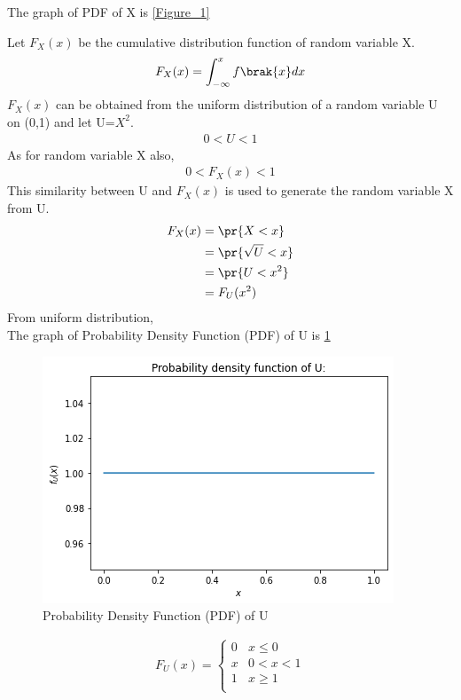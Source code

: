 The graph of PDF of X is \ref{Figure_1}
\par Let $F_X(x)$ be the cumulative distribution function of random variable X.
\begin{align}
    F_X(x)=\int_{-\infty}^x f\brak{x} dx\label{x}
\end{align}
$F_X(x)$ can be obtained from the uniform distribution of a random variable U on (0,1) and let U=$X^2$. 
\begin{align}
    0 < U < 1
\end{align}
As for random variable X also,
\begin{align}
    0 < F_X(x) < 1
\end{align}
This similarity between U and $F_X(x)$ is used to generate the random variable X from U.
\begin{align}
    F_X(x)&= \pr{X<x}\\
    &=\pr{\sqrt{U}<x}\\
    &=\pr{U<x^2}\\
    &=F_U(x^2)\label{y}
\end{align}
From uniform distribution,
\\The graph of Probability Density Function (PDF) of U is \ref{Figure_2}
\begin{figure}[ht]
    \centering
    \includegraphics[width=\columnwidth]{solutions/ec/15/figures/assign2_2.png}
    \caption{Probability Density Function (PDF) of U}
    \label{Figure_2}
\end{figure}
\begin{align}
    F_U(x)=
    \begin{cases}
0 & x\leq0\\
x & 0<x<1
\\
1 & x\geq1\label{z}\\
\end{cases}
\end{align}
